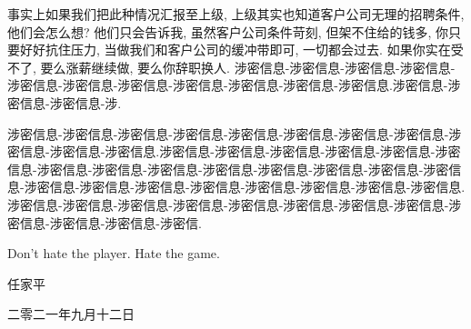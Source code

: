 事实上如果我们把此种情况汇报至上级, 上级其实也知道客户公司无理的招聘条件, 他们会怎么想? 他们只会告诉我, 虽然客户公司条件苛刻, 但架不住给的钱多, 你只要好好抗住压力, 当做我们和客户公司的缓冲带即可, 一切都会过去. 如果你实在受不了, 要么涨薪继续做, 要么你辞职换人. 涉密信息-涉密信息-涉密信息-涉密信息-涉密信息-涉密信息-涉密信息-涉密信息-涉密信息-涉密信息-涉密信息.涉密信息-涉密信息-涉密信息-涉.

涉密信息-涉密信息-涉密信息-涉密信息-涉密信息-涉密信息-涉密信息-涉密信息-涉密信息-涉密信息-涉密信息.涉密信息-涉密信息-涉密信息-涉密信息-涉密信息-涉密信息-涉密信息-涉密信息-涉密信息-涉密信息-涉密信息-涉密信息-涉密信息-涉密信息-涉密信息-涉密信息-涉密信息-涉密信息-涉密信息-涉密信息-涉密信息-涉密信息.涉密信息-涉密信息-涉密信息-涉密信息-涉密信息-涉密信息-涉密信息-涉密信息-涉密信息-涉密信息-涉密信息-涉密信.

Don't hate the player. Hate the game.

\begin{flushright}
    \bfseries

    任家平

    二零二一年九月十二日
\end{flushright}